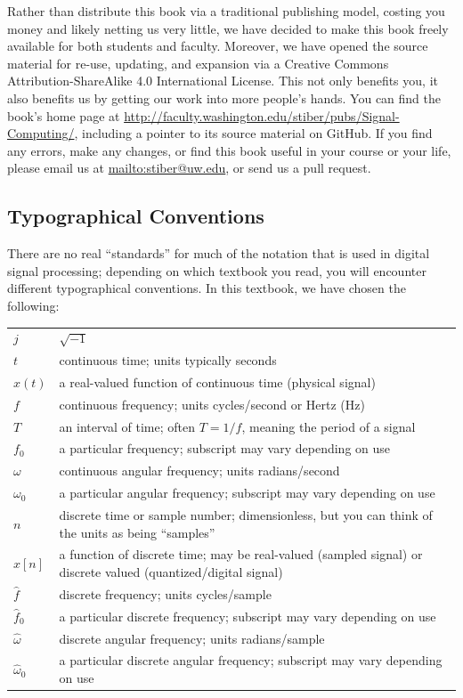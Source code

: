 Rather than distribute this book via a traditional publishing model,
costing you money and likely netting us very little, we have decided
to make this book freely available for both students and
faculty. Moreover, we have opened the source material for re-use,
updating, and expansion via a Creative Commons Attribution-ShareAlike
4.0 International License. This not only benefits you, it also
benefits us by getting our work into more people's hands.  You can
find the book's home page at
\url{http://faculty.washington.edu/stiber/pubs/Signal-Computing/},
including a pointer to its source material on GitHub. If you find any
errors, make any changes, or find this book useful in your course or
your life, please email us at \url{mailto:stiber@uw.edu}, or send us a
pull request.

\subsection*{Typographical Conventions}

There are no real ``standards'' for much of the notation that is used
in digital signal processing; depending on which textbook you read,
you will encounter different typographical conventions. In this
textbook, we have chosen the following:
\begin{center}
\begin{tabular}{lp{5in}}
  $j$    & $\sqrt{-1}$ \\
  $t$    & continuous time; units typically seconds \\
  $x(t)$ & a real-valued function of continuous time (physical signal) \\
  $f$    & continuous frequency; units cycles/second or Hertz (Hz) \\
  $T$    & an interval of time; often $T=1/f$, meaning the period of a
           signal \\
  $f_0$  & a particular frequency; subscript may vary depending on use \\
  $\omega$ & continuous angular frequency; units radians/second \\
  $\omega_0$ & a particular angular frequency; subscript may vary
               depending on use \\
  $n$    & discrete time or sample number; dimensionless, but you can
           think of the units as being ``samples'' \\
  $x[n]$ & a function of discrete time; may be real-valued (sampled
           signal) or discrete valued (quantized/digital signal) \\
  $\hat{f}$ & discrete frequency; units cycles/sample \\
  $\hat{f}_0$  & a particular discrete frequency; subscript may vary
                 depending on use \\
  $\hat{\omega}$ & discrete angular frequency; units radians/sample \\
  $\hat{\omega}_0$ & a particular discrete angular frequency; subscript may vary
               depending on use \\
\end{tabular}
\end{center}

